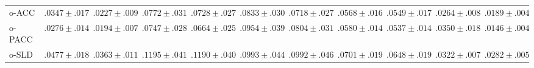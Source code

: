 \begin{tabular}{lcccccccccc}
  o-ACC & ${.0347 \pm .017}$ & ${.0227 \pm .009}$ & ${.0772 \pm .031}$ & ${.0728 \pm .027}$ & $\mathbf{.0833 \pm .030}$ & $\mathbf{.0718 \pm .027}$ & ${.0568 \pm .016}$ & ${.0549 \pm .017}$ & ${.0264 \pm .008}$ & ${.0189 \pm .004}$ \\
  o-PACC & $\mathbf{.0276 \pm .014}$ & $\mathbf{.0194 \pm .007}$ & $\mathbf{.0747 \pm .028}$ & $\mathbf{.0664 \pm .025}$ & ${.0954 \pm .039}$ & ${.0804 \pm .031}$ & ${.0580 \pm .014}$ & $\mathbf{.0537 \pm .014}$ & ${.0350 \pm .018}$ & $\mathbf{.0146 \pm .004}$ \\
  o-SLD & ${.0477 \pm .018}$ & ${.0363 \pm .011}$ & ${.1195 \pm .041}$ & ${.1190 \pm .040}$ & ${.0993 \pm .044}$ & ${.0992 \pm .046}$ & ${.0701 \pm .019}$ & ${.0648 \pm .019}$ & ${.0322 \pm .007}$ & ${.0282 \pm .005}$ \\
  \bottomrule
\end{tabular}
